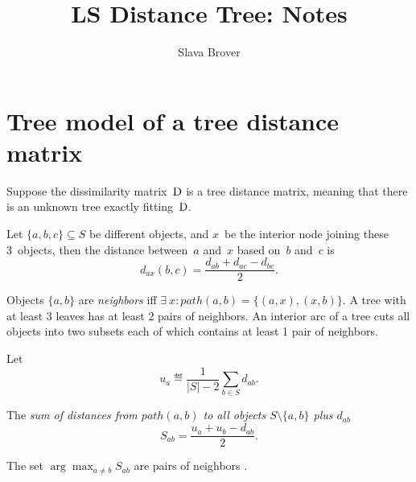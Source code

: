 \documentclass[10pt,a4paper]{article}
\title{LS Distance Tree: Notes}
\author{Slava Brover}
\theoremstyle{plain} \newtheorem{Lem}{Lemma}
\begin{document}
\maketitle

\tableofcontents


\section{Tree model of a tree distance matrix} \label{treeDist2treeModel}

Suppose the dissimilarity matrix~$\mathrm D$ is a tree distance matrix, 
meaning that there is an unknown tree exactly fitting~$\mathrm D$.  %

Let $\{a,b,c\} \subseteq S$ be different objects, 
and $x$~be the interior node joining these 3~objects, 
then the distance between~$a$ and~$x$ based on~$b$ and~$c$ is
$$ d_{ax}(b,c) = \frac {d_{ab} + d_{ac} - d_{bc}} 2. $$

Objects $\{a,b\}$ are {\em neighbors} iff $\exists \ x : path(a,b) = \{(a,x),(x,b)\}$.
A tree with at least 3 leaves has at least 2 pairs of neighbors.
An interior arc of a tree cuts all objects into two subsets each of which contains at least 1 pair of neighbors.
 
Let
$$ u_a \eqdef \frac 1 {|S| - 2} \sum_{b \in S} d_{ab}. $$

The {\em sum of distances from $path(a,b)$ to all objects $S \setminus \{a,b\}$ plus $d_{ab}$}
$$ S_{ab} = \frac {u_a + u_b - d_{ab}} 2. $$

The set $\arg \max_{a \ne b} S_{ab}$ are pairs of neighbors
\cite{Keppler}.

\end{document}
